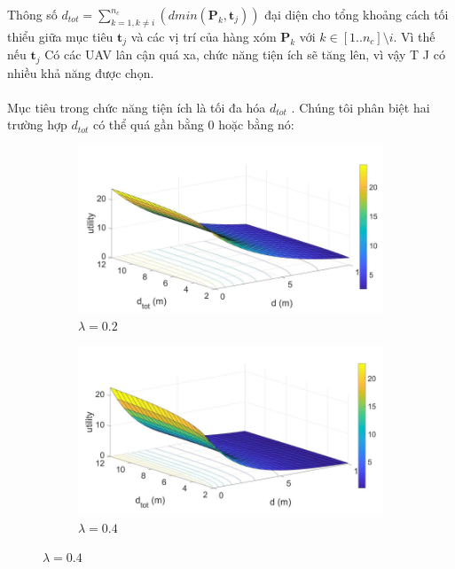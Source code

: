 \documentclass[11pt,openany]{book}
\begin{document}
\begin{algorimth}[H]
\begin{equation}
\end{equation}
Thông số $d_{tot} = \sum_{k=1, k\neq i}^{n_c}(dmin(\mathbf{P}_k,\mathbf{t}_j)) $ đại diện cho tổng khoảng cách tối thiểu giữa mục tiêu $\mathbf{t}_j$ và các vị trí của hàng xóm $\mathbf{P}_k$ với $k \in [1..n_c]\setminus i$. Vì thế nếu $\mathbf{t}_j$ Có các UAV lân cận quá xa, chức năng tiện ích sẽ tăng lên, vì vậy T J có nhiều khả năng được chọn.\\\\
Mục tiêu trong chức năng tiện ích là tối đa hóa $d_{tot}$ . Chúng tôi phân biệt hai trường hợp $d_{tot}$ có thể quá gần bằng 0 hoặc bằng nó:
\begin{figure}[H]
    \centering
    \begin{subfigure}[H]{0.4\linewidth}
        \centering
        \includegraphics[width=\linewidth]{assets/3_8_a.png}
        \caption{{$\lambda=0.2$}}
        \label{fig:3.8a}
    \end{subfigure}
    \begin{subfigure}[H]{0.4\linewidth}
        \centering
        \includegraphics[width=\linewidth]{assets/3_8_b.png}
        \caption{{$\lambda=0.4$}}
        \label{fig:3.8b}

\end{subfigure}
\end{figure}
\end{algorimth}
\end{document}
